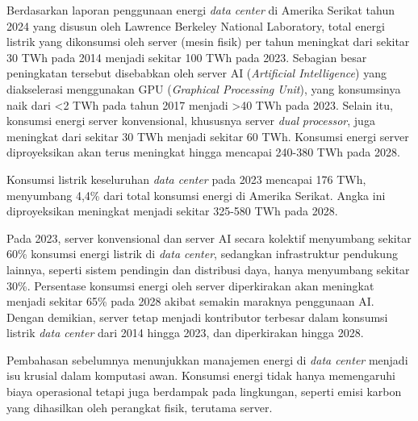Berdasarkan laporan penggunaan energi \textit{data center} di Amerika Serikat tahun 2024 yang disusun oleh Lawrence Berkeley National Laboratory, total energi listrik yang dikonsumsi oleh server (mesin fisik) per tahun meningkat dari sekitar 30 TWh pada 2014 menjadi sekitar 100 TWh pada 2023. Sebagian besar peningkatan tersebut disebabkan oleh server AI (\textit{Artificial Intelligence}) yang diakselerasi menggunakan GPU (\textit{Graphical Processing Unit}), yang konsumsinya naik dari <2 TWh pada tahun 2017 menjadi >40 TWh pada 2023. Selain itu, konsumsi energi server konvensional, khususnya server \textit{dual} \textit{processor}, juga meningkat dari sekitar 30 TWh menjadi sekitar 60 TWh. Konsumsi energi server diproyeksikan akan terus meningkat hingga mencapai 240-380 TWh pada 2028.

Konsumsi listrik keseluruhan \textit{data center} pada 2023 mencapai 176 TWh, menyumbang 4,4\% dari total konsumsi energi di Amerika Serikat. Angka ini diproyeksikan meningkat menjadi sekitar 325-580 TWh pada 2028.

Pada 2023, server konvensional dan server AI secara kolektif menyumbang sekitar 60\% konsumsi energi listrik di \textit{data center}, sedangkan infrastruktur pendukung lainnya, seperti sistem pendingin dan distribusi daya, hanya menyumbang sekitar 30\%. Persentase konsumsi energi oleh server diperkirakan akan meningkat menjadi sekitar 65\% pada 2028 akibat semakin maraknya penggunaan AI. Dengan demikian, server tetap menjadi kontributor terbesar dalam konsumsi listrik \textit{data center} dari 2014 hingga 2023, dan diperkirakan hingga 2028.

Pembahasan sebelumnya menunjukkan manajemen energi di \textit{data center} menjadi isu krusial dalam komputasi awan. Konsumsi energi tidak hanya memengaruhi biaya operasional tetapi juga berdampak pada lingkungan, seperti emisi karbon yang dihasilkan oleh perangkat fisik, terutama server.

